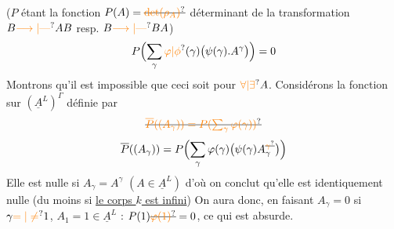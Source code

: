 ($P$ étant la fonction  $P(A)=\deleted{\unsure{\det(\rho_A)}}$   déterminant de la transformation $B\unsure{\longrightarrow|\text{---}}AB$ resp. $B\unsure{\longrightarrow|\text{---}}BA$)
\[
P\Bigl(\sum_\gamma \unsure{\varphi|\phi}(\gamma)\bigl(\psi(\gamma).A^\gamma\bigr)\Bigr)=0
\]
Montrons qu'il est impossible que ceci soit   pour $\unsure{\forall|\exists} A$. Considérons la fonction sur $(\underline A^L)^\Gamma$ définie par
\[
\deleted{\unsure{\overline P((A_\gamma))=P(\sum_\gamma\varphi(\gamma))}}
\]
\[
\overline P((A_\gamma))=P\Bigl(\sum_\gamma\varphi(\gamma)\bigl(\psi(\gamma)A_\gamma^{\deleted{\unsure{\gamma}}}\bigr)\Bigr)
\]
Elle est nulle si  $A_\gamma=A^\gamma$ $(A\in\underline A^L)$ d'où on conclut qu'elle est identiquement nulle (du moins si \uline{le corps $k$ est infini})
On aura donc, en faisant $A_\gamma=0$ si $\gamma\unsure{=|\ne}1$, $A_1=1\in\underline A^L$ : $P(1)\deleted{\unsure{\varphi(1)}}=0$, ce qui est absurde.

